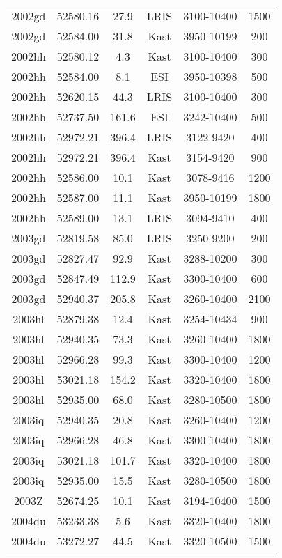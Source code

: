 \begin{table*}
\begin{tabular}{cccccc}
2002gd	 & 52580.16	 &27.9	 &LRIS	 & 3100-10400 &1500 \\ 
2002gd	 & 52584.00	 &31.8	 &Kast	 & 3950-10199 &200 \\ 
2002hh	 & 52580.12	 &4.3	 &Kast	 & 3100-10400 &300 \\ 
2002hh	 & 52584.00	 &8.1	 &ESI	 & 3950-10398 &500 \\ 
2002hh	 & 52620.15	 &44.3	 &LRIS	 & 3100-10400 &300 \\ 
2002hh	 & 52737.50	 &161.6	 &ESI	 & 3242-10400 &500 \\ 
2002hh	 & 52972.21	 &396.4	 &LRIS	 & 3122-9420 &400 \\ 
2002hh	 & 52972.21	 &396.4	 &Kast	 & 3154-9420 &900 \\ 
2002hh	 & 52586.00	 &10.1	 &Kast	 & 3078-9416 &1200 \\ 
2002hh	 & 52587.00	 &11.1	 &Kast	 & 3950-10199 &1800 \\ 
2002hh	 & 52589.00	 &13.1	 &LRIS	 & 3094-9410 &400 \\ 
2003gd	 & 52819.58	 &85.0	 &LRIS	 & 3250-9200 &200 \\ 
2003gd	 & 52827.47	 &92.9	 &Kast	 & 3288-10200 &300 \\ 
2003gd	 & 52847.49	 &112.9	 &Kast	 & 3300-10400 &600 \\ 
2003gd	 & 52940.37	 &205.8	 &Kast	 & 3260-10400 &2100 \\ 
2003hl	 & 52879.38	 &12.4	 &Kast	 & 3254-10434 &900 \\ 
2003hl	 & 52940.35	 &73.3	 &Kast	 & 3260-10400 &1800 \\ 
2003hl	 & 52966.28	 &99.3	 &Kast	 & 3300-10400 &1200 \\ 
2003hl	 & 53021.18	 &154.2	 &Kast	 & 3320-10400 &1800 \\ 
2003hl	 & 52935.00	 &68.0	 &Kast	 & 3280-10500 &1800 \\ 
2003iq	 & 52940.35	 &20.8	 &Kast	 & 3260-10400 &1200 \\ 
2003iq	 & 52966.28	 &46.8	 &Kast	 & 3300-10400 &1800 \\ 
2003iq	 & 53021.18	 &101.7	 &Kast	 & 3320-10400 &1800 \\ 
2003iq	 & 52935.00	 &15.5	 &Kast	 & 3280-10500 &1800 \\ 
2003Z	 & 52674.25	 &10.1	 &Kast	 & 3194-10400 &1500 \\ 
2004du	 & 53233.38	 &5.6	 &Kast	 & 3320-10400 &1800 \\ 
2004du	 & 53272.27	 &44.5	 &Kast	 & 3320-10500 &1500 \\ 

\end{tabular}
\end{table*}
